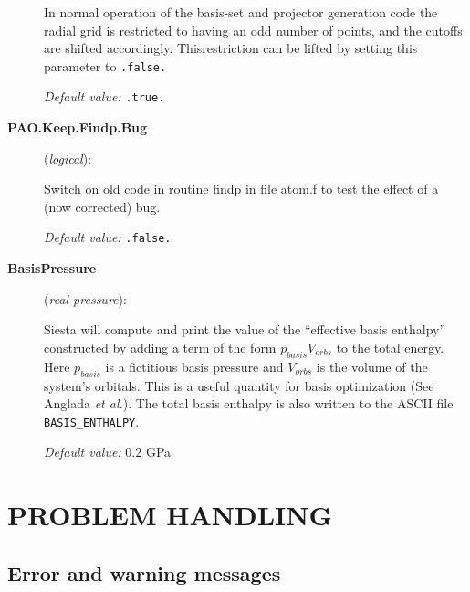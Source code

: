 \documentclass[11pt]{article}
\begin{document}
\begin{description}
In normal operation of the basis-set and projector generation code the
radial grid is restricted to having an odd number of points, and the
cutoffs are shifted accordingly. Thisrestriction can be lifted by
setting this parameter to {\tt .false.}

{\it Default value:} { \tt .true.}

\item[{\bf PAO.Keep.Findp.Bug}] ({\it logical}): 

Switch on old code in routine findp in file atom.f to test
the effect of a (now corrected) bug.

{\it Default value:} { \tt .false.}

\item[{\bf BasisPressure}] ({\it real pressure}):

{\sc Siesta} will compute and print the value of the ``effective basis
enthalpy'' constructed by adding a term of the form
$p_{basis}V_{orbs}$ to the total energy. Here $p_{basis}$ is a
fictitious basis pressure and $V_{orbs}$ is the volume of the system's
orbitals. This is a useful quantity for basis optimization (See
Anglada {\it et al.\/}). The total basis enthalpy is also written to
the ASCII file {\tt BASIS\_ENTHALPY}.

{\it Default value:} { $0.2$ GPa}

\end{description}

\section{PROBLEM HANDLING}

\subsection{Error and warning messages}
\end{document}
